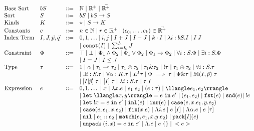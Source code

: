 $$
\begin{array}{llll}
\text{Base Sort} & bS & ::= & \mathbb{N} \; | \; \mathbb{R}^+ \; | \; \vec{\mathbb{R}^+}\\
\text{Sort} & S & ::= & bS \;|\; bS \to S\\
\text{Kinds} & K & ::= & \star \;|\; S \to K\\
\text{Constants} & c & ::= & n \in \mathbb{N} \;|\; r \in \mathbb{R}^+ \;|\; (c_0,\dots,c_k) \in \vec{\mathbb{R}^+}\\
\text{Index Term} & I,J,\vec{p},\vec{q} & ::= & 0,1,\dots | \; i,j \; | \; I + J \; | \; I - J \; | \; k \cdot I \; | \; \lambda i : bS. I \; | \; I \, J \; \\
&&&| \; \texttt{const}(I) \;|\; \sum_{i=I_0}^{I_1} J
\\
\text{Constraint} & \Phi & ::= & \top \; | \; \bot \; | \; \Phi_1 \wedge \Phi_2 \;|\; \Phi_1 \vee \Phi_2  \;|\; \Phi_1 \to \Phi_2 \;|\; \forall i : S. \Phi \;|\; \exists i : S.\Phi \\
&&&|\; I = J \;|\; I \leq J\\
\text{Type} & \tau & ::= & 1 \;|\; \alpha \;|\; \tau_1 \loli \tau_2 \;|\; \tau_1 \otimes \tau_2 \;|\; \tau_1 \amp \tau_2 \;|\; !\tau \;|\; \tau_1 \oplus \tau_2 \;|\; \forall i : S . \tau\\
&&&|\; \exists i : S. \tau \; | \; \forall \alpha : K. \tau \;|\; L^I \tau \;|\; \Phi \implies \tau \;|\; \Phi \amp \tau \;|\; \M(I,\vec{p}) \; \tau \\
&&&|\; [I|\vec{p}] \; \tau \;|\; [I] \; \tau \; |\; \lambda i : S. \tau \;|\; \tau \; I\\
\text{Expression} & e & ::= & 0,1,\dots \;|\; x \;|\; \lambda x. e \;|\; e_1 \; e_2 \;|\; (e : \tau) \;|\; \llangle e_1,e_2 \rrangle \\
&&&|\; \texttt{let} \; \llangle x,y \rrangle = e\; \texttt{in} \; e' \;|\; (e_1,e_2) \; |\; \texttt{fst}(e) \;|\; \texttt{snd}(e) |\; !e \\
&&&|\; \texttt{let} \; !x = e \; \texttt{in} \; e' \;|\; \texttt{inl}(e) \;|\; \texttt{inr}(e) \;|\; \texttt{case}(e,x.e_1,y.e_2) \\
&&&|\; \texttt{case}(e,e_1,x.e_2) \;|\; \texttt{fix}(x.e) \;|\; \Lambda i. e \;|\; e \; [I] \;|\; \Lambda \alpha.e \;|\; e \; [\tau] \\
&&&|\; \texttt{nil} \;|\; e_1 :: e_2 \;|\; \texttt{match}(e,e_1,x.y.e_2) \;|\; \texttt{pack}[I](e) \\
&&&|\; \texttt{unpack} \; (i,x) = e \; \texttt{in} \; e' \;|\; \Lambda. e \;|\; e \;\{\} \;|\; <e> \\

\end{array}$$
